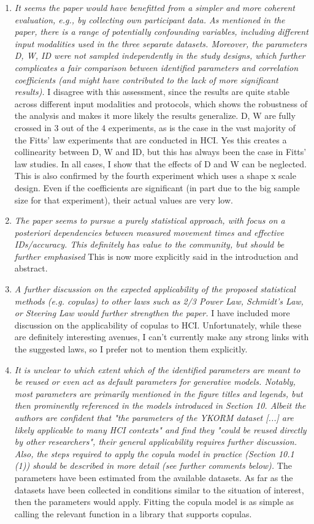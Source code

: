 \documentclass{article}
\begin{document}
\begin{enumerate}
    \item \textit{It seems the paper would have benefitted from a simpler and more coherent evaluation, e.g., by collecting own participant data. As mentioned in the paper, there is a range of potentially confounding variables, including different input modalities used in the three separate datasets. Moreover, the parameters D, W, ID were not sampled independently in the study designs, which further complicates a fair comparison between identified parameters and correlation coefficients (and might have contributed to the lack of more significant results).} I disagree with this assessment, since the results are quite stable across different input modalities and protocols, which shows the robustness of the analysis and makes it more likely the results generalize. D, W are fully crossed in 3 out of the 4 experiments, as is the case in the vast majority of the Fitts' law experiments that are conducted in HCI. Yes this creates a collinearity between D, W and ID, but this has always been the case in Fitts' law studies. In all cases, I show that the effects of D and W can be neglected. This is also confirmed by the fourth experiment which uses a shape x scale design. Even if the coefficients are significant (in part due to the big sample size for that experiment), their actual values are very low. 
    \item \textit{The paper seems to pursue a purely statistical approach, with focus on a posteriori dependencies between measured movement times and effective IDs/accuracy. This definitely has value to the community, but should be further emphasised} This is now more explicitly said in the introduction and abstract.
    \item \textit{A further discussion on the expected applicability of the proposed statistical methods (e.g. copulas) to other laws such as 2/3 Power Law, Schmidt's Law, or Steering Law would further strengthen the paper.} I have included more discussion on the applicability of copulas to HCI. Unfortunately, while these are definitely interesting avenues, I can't currently make any strong links with the suggested laws, so I prefer not to mention them explicitly.
    \item \textit{It is unclear to which extent which of the identified parameters are meant to be reused or even act as default parameters for generative models. Notably, most parameters are primarily mentioned in the figure titles and legends, but then prominently referenced in the models introduced in Section 10. Albeit the authors are confident that "the parameters of the YKORM dataset [...] are likely applicable to many HCI contexts" and find they "could be reused directly by other researchers", their general applicability requires further discussion. Also, the steps required to apply the copula model in practice (Section 10.1 (1)) should be described in more detail (see further comments below).} The parameters have been estimated from the available datasets. As far as the datasets have been collected in conditions similar to the situation of interest, then the parameters would apply. Fitting the copula model is as simple as calling the relevant function in a library that supports copulas.

\end{enumerate}
\end{document}
